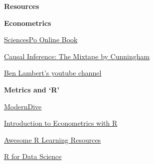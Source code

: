 \documentclass[11pt, aspectratio=169]{beamer}
\newenvironment{wideitemize}{\itemize\addtolength{\itemsep}{5pt}}{\enditemize}
\begin{document}
\begin{frame}{\bf \large Resources}
\begin{wideitemize}
	\item \textbf{Econometrics}
\begin{wideitemize}
	\item \href{https://scpoecon.github.io/ScPoEconometrics/index.html}{SciencesPo Online Book}
	\item \href{https://mixtape.scunning.com/}{Causal Inference: The Mixtape by Cunningham}
	\item \href{https://www.youtube.com/user/SpartacanUsuals}{Ben Lambert's youtube channel}
\end{wideitemize}
			\item \textbf{Metrics and `R'}
\begin{wideitemize}
	\item \href{https://moderndive.com/}{ModernDive}
	\item \href{https://www.econometrics-with-r.org/}{Introduction to Econometrics with R}
	\item \href{https://github.com/iamericfletcher/awesome-r-learning-resources}{Awesome R Learning Resources}
	\item \href{https://r4ds.hadley.nz/}{R for Data Science}
\end{wideitemize}	
\end{wideitemize}
	
\end{frame}
\end{document}
